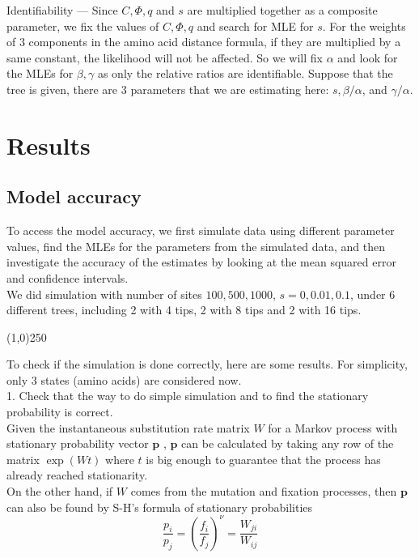 \documentclass[13pt]{article}
\begin{document}
Identifiability --- Since $C, \Phi, q$ and $s$ are multiplied together as a composite parameter, we fix the values of $C, \Phi, q$ and search for MLE for $s$. For the weights of 3 components in the amino acid distance formula, if they are multiplied by a same constant, the likelihood will not be affected. So we will fix $\alpha$ and look for the MLEs for $\beta, \gamma$ as only the relative ratios are identifiable. Suppose that the tree is given, there are $3$ parameters that we are estimating here: $s, \beta/\alpha$, and $\gamma/\alpha$.



\section{Results}
\subsection{Model accuracy}
To access the model accuracy, we first simulate data using different parameter values, find the MLEs for the parameters from the simulated data, and then investigate the accuracy of the estimates by looking at the mean squared error and confidence intervals.\\

We did simulation with number of sites $100, 500, 1000$, $s = 0, 0.01, 0.1$, under 6 different trees, including 2 with 4 tips, 2 with 8 tips and 2 with 16 tips. 



\begin{center}
\line(1,0){250}
\end{center}

To check if the simulation is done correctly, here are some results. For simplicity, only 3 states (amino acids) are considered now. \\

1. Check that the way to do simple simulation and to find the stationary probability is correct.\\

Given the instantaneous substitution rate matrix $W$ for a Markov process with stationary probability vector $\mathbf{p}$ , $\mathbf{p}$ can be calculated by taking any row of the matrix $\exp(Wt)$ where $t$ is big enough to guarantee that the process has already reached stationarity. \\

On the other hand, if $W$ comes from the mutation and fixation processes, then $\mathbf{p}$ can also be found by S-H's formula of stationary probabilities
\begin{equation}
\frac{p_i}{p_j} = (\frac{f_i}{f_j})^{\nu} = \frac{W_{ji}}{W_{ij}}
\label{eq:stationary}
\end{equation}
\end{document}
